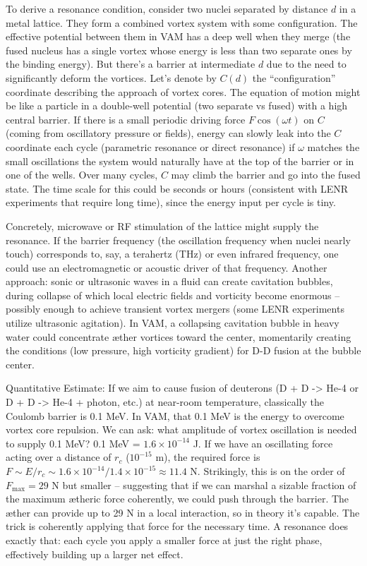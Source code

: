 To derive a resonance condition, consider two nuclei separated by distance $d$ in a metal lattice. They form a combined vortex system with some configuration. The effective potential between them in VAM has a deep well when they merge (the fused nucleus has a single vortex whose energy is less than two separate ones by the binding energy). But there’s a barrier at intermediate $d$ due to the need to significantly deform the vortices. Let’s denote by $C(d)$ the “configuration” coordinate describing the approach of vortex cores. The equation of motion might be like a particle in a double-well potential (two separate vs fused) with a high central barrier. If there is a small periodic driving force $F \cos(\omega t)$ on $C$ (coming from oscillatory pressure or fields), energy can slowly leak into the $C$ coordinate each cycle (parametric resonance or direct resonance) if $\omega$ matches the small oscillations the system would naturally have at the top of the barrier or in one of the wells. Over many cycles, $C$ may climb the barrier and go into the fused state. The time scale for this could be seconds or hours (consistent with LENR experiments that require long time), since the energy input per cycle is tiny.


Concretely, microwave or RF stimulation of the lattice might supply the resonance. If the barrier frequency (the oscillation frequency when nuclei nearly touch) corresponds to, say, a terahertz (THz) or even infrared frequency, one could use an electromagnetic or acoustic driver of that frequency. Another approach: sonic or ultrasonic waves in a fluid can create cavitation bubbles, during collapse of which local electric fields and vorticity become enormous – possibly enough to achieve transient vortex mergers (some LENR experiments utilize ultrasonic agitation). In VAM, a collapsing cavitation bubble in heavy water could concentrate æther vortices toward the center, momentarily creating the conditions (low pressure, high vorticity gradient) for D-D fusion at the bubble center.


Quantitative Estimate: If we aim to cause fusion of deuterons (D + D -> He-4 or D + D -> He-4 + photon, etc.) at near-room temperature, classically the Coulomb barrier is 0.1 MeV. In VAM, that 0.1 MeV is the energy to overcome vortex core repulsion. We can ask: what amplitude of vortex oscillation is needed to supply 0.1 MeV? 0.1 MeV = $1.6\times10^{-14}$ J. If we have an oscillating force acting over a distance of $r_c$ ($10^{-15}$ m), the required force is $F \sim E/r_c \sim 1.6\times10^{-14} / 1.4\times10^{-15} \approx 11.4$ N. Strikingly, this is on the order of $F_{\max}=29$ N but smaller – suggesting that if we can marshal a sizable fraction of the maximum ætheric force coherently, we could push through the barrier. The æther can provide up to 29 N in a local interaction, so in theory it’s capable. The trick is coherently applying that force for the necessary time. A resonance does exactly that: each cycle you apply a smaller force at just the right phase, effectively building up a larger net effect.


